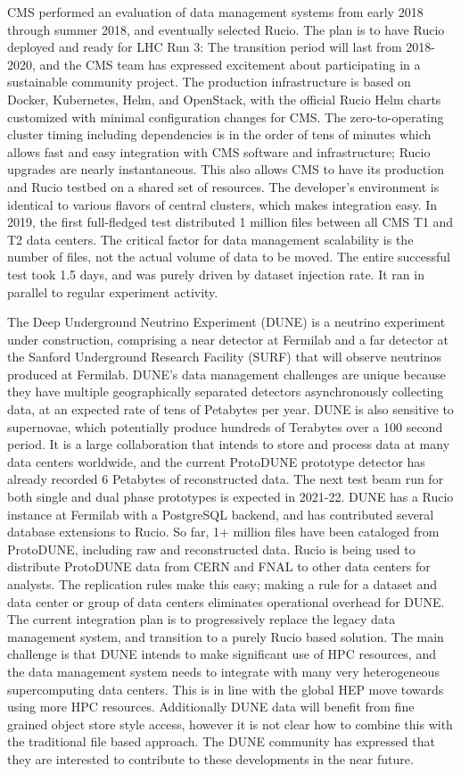 \documentclass[11pt]{article}
\begin{document}
CMS performed an evaluation of data management systems from early 2018 through summer 2018, and eventually selected Rucio. The plan is to have Rucio deployed and ready for LHC Run 3: The transition period will last from 2018-2020, and the CMS team has expressed excitement about participating in a sustainable community project. The production infrastructure is based on Docker, Kubernetes, Helm, and OpenStack, with the official Rucio Helm charts customized with minimal configuration changes for CMS. The zero-to-operating cluster timing including dependencies is in the order of tens of minutes which allows fast and easy integration with CMS software and infrastructure; Rucio upgrades are nearly instantaneous. This also allows CMS to have its production and Rucio testbed on a shared set of resources. The developer's environment is identical to various flavors of central clusters, which makes integration easy. In 2019, the first full-fledged test distributed 1 million files between all CMS T1 and T2 data centers. The critical factor for data management scalability is the number of files, not the actual volume of data to be moved. The entire successful test took 1.5 days, and was purely driven by dataset injection rate. It ran in parallel to regular experiment activity.

The Deep Underground Neutrino Experiment (DUNE) is a neutrino experiment under construction, comprising a near detector at Fermilab and a far detector at the Sanford Underground Research Facility (SURF) that will observe neutrinos produced at Fermilab. DUNE's data management challenges are unique because they have multiple geographically separated detectors asynchronously collecting data, at an expected rate of tens of Petabytes per year. DUNE is also sensitive to supernovae, which potentially produce hundreds of Terabytes over a 100 second period. It is a large collaboration that intends to store and process data at many data centers worldwide, and the current ProtoDUNE prototype detector has already recorded 6 Petabytes of reconstructed data. The next test beam run for both single and dual phase prototypes is expected in 2021-22. DUNE has a Rucio instance at Fermilab with a PostgreSQL backend, and has contributed several database extensions to Rucio. So far, 1+ million files have been cataloged from ProtoDUNE, including raw and reconstructed data. Rucio is being used to distribute ProtoDUNE data from CERN and FNAL to other data centers for analysts. The replication rules make this easy; making a rule for a dataset and data center or group of data centers eliminates operational overhead for DUNE. The current integration plan is to progressively replace the legacy data management system, and transition to a purely Rucio based solution. The main challenge is that DUNE intends to make significant use of HPC resources, and the data management system needs to integrate with many very heterogeneous supercomputing data centers. This is in line with the global HEP move towards using more HPC resources. Additionally DUNE data will benefit from fine grained object store style access, however it is not clear how to combine this with the traditional file based approach. The DUNE community has expressed that they are interested to contribute to these developments in the near future.
\end{document}

